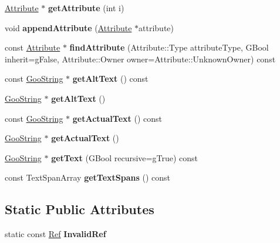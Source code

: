 \begin{DoxyCompactItemize}
\hyperlink{class_attribute}{Attribute} $\ast$ {\bfseries get\+Attribute} (int i)
\item 
\mbox{\label{class_struct_element_a756a26ab8231d119bee3ba9bc0ed68d6}} 
void {\bfseries append\+Attribute} (\hyperlink{class_attribute}{Attribute} $\ast$attribute)
\item 
\mbox{\label{class_struct_element_a6480fa33ef8f3cfb9c4b59c40266ff6f}} 
const \hyperlink{class_attribute}{Attribute} $\ast$ {\bfseries find\+Attribute} (Attribute\+::\+Type attribute\+Type, G\+Bool inherit=g\+False, Attribute\+::\+Owner owner=Attribute\+::\+Unknown\+Owner) const
\item 
\mbox{\label{class_struct_element_a7cdf351fb918e192d5bcf90e5bf6e8e2}} 
const \hyperlink{class_goo_string}{Goo\+String} $\ast$ {\bfseries get\+Alt\+Text} () const
\item 
\mbox{\label{class_struct_element_ab1865d9d001ac4a001c5baf1178b7399}} 
\hyperlink{class_goo_string}{Goo\+String} $\ast$ {\bfseries get\+Alt\+Text} ()
\item 
\mbox{\label{class_struct_element_a7d60f58d5f9116970f9cc235673fc7e5}} 
const \hyperlink{class_goo_string}{Goo\+String} $\ast$ {\bfseries get\+Actual\+Text} () const
\item 
\mbox{\label{class_struct_element_a642c8c96592304b5874a086fafed2f76}} 
\hyperlink{class_goo_string}{Goo\+String} $\ast$ {\bfseries get\+Actual\+Text} ()
\item 
\mbox{\label{class_struct_element_ac0452235ae3a34d4bcfa9b81e79f3c8b}} 
\hyperlink{class_goo_string}{Goo\+String} $\ast$ {\bfseries get\+Text} (G\+Bool recursive=g\+True) const
\item 
\mbox{\label{class_struct_element_a87b41a0fd2758c218c868f994d0f257d}} 
const Text\+Span\+Array {\bfseries get\+Text\+Spans} () const
\end{DoxyCompactItemize}
\subsection*{Static Public Attributes}
\begin{DoxyCompactItemize}
\item 
\mbox{\label{class_struct_element_af4141d39c26e0640186c5540ab2f701a}} 
static const \hyperlink{struct_ref}{Ref} {\bfseries Invalid\+Ref}
\end{DoxyCompactItemize}
